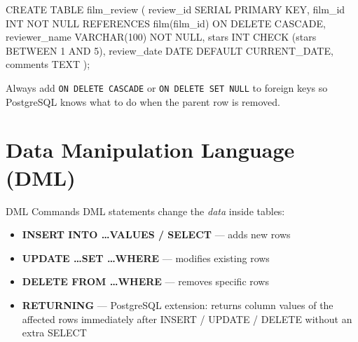 \documentclass[11pt,a4paper]{article}
\begin{document}
\begin{sqlcode}[title={\texttt{</>}\quad DDL Example --- Create film\_review}]
CREATE TABLE film_review (
    review_id     SERIAL PRIMARY KEY,
    film_id       INT NOT NULL
                  REFERENCES film(film_id) ON DELETE CASCADE,
    reviewer_name VARCHAR(100) NOT NULL,
    stars         INT CHECK (stars BETWEEN 1 AND 5),
    review_date   DATE DEFAULT CURRENT_DATE,
    comments      TEXT
);
\end{sqlcode}

\begin{tipbox}
Always add \texttt{ON DELETE CASCADE} or \texttt{ON DELETE SET NULL} to foreign keys so PostgreSQL knows what to do when the parent row is removed.
\end{tipbox}

\section{Data Manipulation Language (DML)}

\begin{conceptbox}{DML Commands}
DML statements change the \emph{data} inside tables:
\begin{itemize}[noitemsep]
  \item \textbf{INSERT INTO \ldots VALUES / SELECT} --- adds new rows
  \item \textbf{UPDATE \ldots SET \ldots WHERE} --- modifies existing rows
  \item \textbf{DELETE FROM \ldots WHERE} --- removes specific rows
  \item \textbf{RETURNING} --- PostgreSQL extension: returns column values of the affected rows immediately after INSERT / UPDATE / DELETE without an extra SELECT
\end{itemize}
\end{conceptbox}
\end{document}
